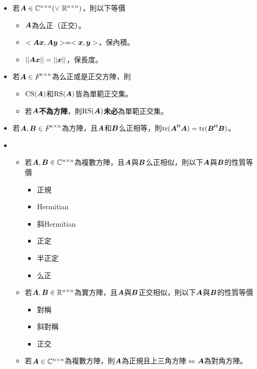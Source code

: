 \begin{itemize}
\begin{table}[H]
\begin{tabular}{|c|c|c|c|}
			\hline
		\end{tabular}
		\renewcommand{\arraystretch}{1}
    \end{table}
    \item 若$\mat{A} \in \C^{n \times n} (\lor \ \R^{n \times n})$，則以下等價\begin{itemize}
		\item $\mat{A}$為么正（正交）。
		\item $<\mat{A}\vec{x}, \mat{A}\vec{y}> = <\vec{x}, \vec{y}>$，保內積。
		\item $||\mat{A}\vec{x}|| = ||\vec{x}||$，保長度。
    \end{itemize}
    \item 若$\mat{A} \in \F^{n \times n}$為么正或是正交方陣，則\begin{itemize}
		\item $\cs(\mat{A})$和$\rs(\mat{A})$皆為單範正交集。
		\item 若$\mat{A}$\textbf{不為方陣}，則$\rs(\mat{A})$\textbf{未必}為單範正交集。
    \end{itemize}
    \item 若$\mat{A}, \mat{B} \in \F^{n \times n}$為方陣，且$\mat{A}$和$\mat{B}$么正相等，則$\tr(\mat{A}\herm\mat{A}) = \tr(\mat{B}\herm\mat{B})$。
    \item \begin{itemize}
		\item 若$\mat{A}, \mat{B} \in \C^{n \times n}$為複數方陣，且$\mat{A}$與$\mat{B}$么正相似，則以下$\mat{A}$與$\mat{B}$的性質等價
			\begin{itemize}
				\item 正規
				\item Hermitian
				\item 斜Hermitian
				\item 正定
				\item 半正定
				\item 么正
			\end{itemize}
		\item 若$\mat{A}, \mat{B} \in \R^{n \times n}$為實方陣，且$\mat{A}$與$\mat{B}$正交相似，則以下$\mat{A}$與$\mat{B}$的性質等價
		\begin{itemize}
			\item 對稱
			\item 斜對稱
			\item 正交
		\end{itemize}
		\item 若$\mat{A} \in \C^{n \times n}$為複數方陣，則$\mat{A}$為正規且上三角方陣$\iff$$\mat{A}$為對角方陣。
$$
\end{itemize}
\end{itemize}
